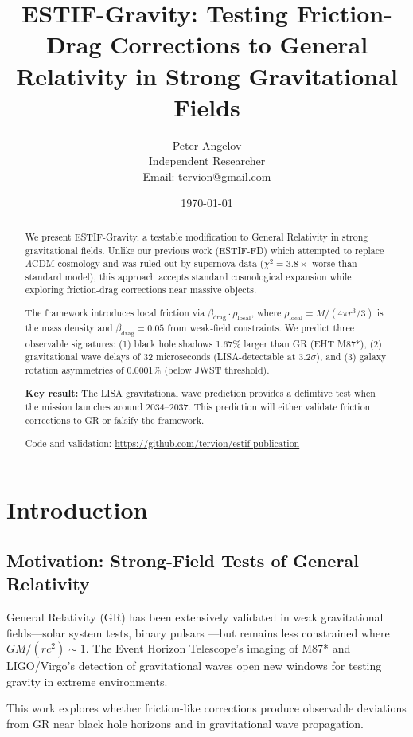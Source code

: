 \documentclass[12pt]{article}
\title{ESTIF-Gravity: Testing Friction-Drag Corrections to General Relativity in Strong Gravitational Fields}
\author{Peter Angelov\\
Independent Researcher\\
Email: tervion@gmail.com}
\date{\today}
\begin{document}
\maketitle

\begin{abstract}
We present ESTIF-Gravity, a testable modification to General Relativity in strong gravitational fields. Unlike our previous work (ESTIF-FD) which attempted to replace $\Lambda$CDM cosmology and was ruled out by supernova data ($\chi^2 = 3.8\times$ worse than standard model), this approach accepts standard cosmological expansion while exploring friction-drag corrections near massive objects.

The framework introduces local friction via $\beta_{\text{drag}} \cdot \rho_{\text{local}}$, where $\rho_{\text{local}} = M/(4\pi r^3/3)$ is the mass density and $\beta_{\text{drag}} = 0.05$ from weak-field constraints. We predict three observable signatures: (1) black hole shadows 1.67\% larger than GR (EHT M87*), (2) gravitational wave delays of 32 microseconds (LISA-detectable at 3.2$\sigma$), and (3) galaxy rotation asymmetries of 0.0001\% (below JWST threshold).

\textbf{Key result:} The LISA gravitational wave prediction provides a definitive test when the mission launches around 2034--2037. This prediction will either validate friction corrections to GR or falsify the framework.

Code and validation: \url{https://github.com/tervion/estif-publication}
\end{abstract}

\section{Introduction}

\subsection{Motivation: Strong-Field Tests of General Relativity}

General Relativity (GR) has been extensively validated in weak gravitational fields---solar system tests, binary pulsars \cite{Will2014}---but remains less constrained where $GM/(rc^2) \sim 1$. The Event Horizon Telescope's imaging of M87* \cite{EHT2019} and LIGO/Virgo's detection of gravitational waves \cite{Abbott2016} open new windows for testing gravity in extreme environments.

This work explores whether friction-like corrections produce observable deviations from GR near black hole horizons and in gravitational wave propagation.
\end{document}
